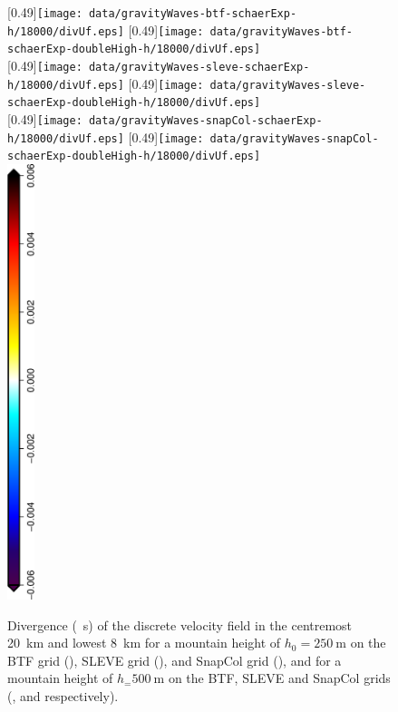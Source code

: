 \begin{figure}
	\captionsetup[subfigure]{position=b}
	\centering
	[0.49\textwidth]{\texttt{[image: data/gravityWaves-btf-schaerExp-h/18000/divUf.eps]}}
	\hfill
	[0.49\textwidth]{\texttt{[image: data/gravityWaves-btf-schaerExp-doubleHigh-h/18000/divUf.eps]}} \\
%
	[0.49\textwidth]{\texttt{[image: data/gravityWaves-sleve-schaerExp-h/18000/divUf.eps]}}
	\hfill
	[0.49\textwidth]{\texttt{[image: data/gravityWaves-sleve-schaerExp-doubleHigh-h/18000/divUf.eps]}} \\
%
	[0.49\textwidth]{\texttt{[image: data/gravityWaves-snapCol-schaerExp-h/18000/divUf.eps]}}
	\hfill
	[0.49\textwidth]{\texttt{[image: data/gravityWaves-snapCol-schaerExp-doubleHigh-h/18000/divUf.eps]}} \\
%
	\includegraphics[height=5in,angle=270]{legends/divU.eps}
%
	\caption{Divergence (\si{\per\second}) of the discrete velocity field in the centremost \SI{20}{\kilo\meter} and lowest \SI{8}{\kilo\meter} for a mountain height of $h_0 = \SI{250}{\meter}$ on the BTF grid (), SLEVE grid (), and SnapCol grid (), and for a mountain height of $h_ = \SI{500}{\meter}$ on the BTF, SLEVE and SnapCol grids (,  and  respectively).}
	\label{fig:gw:div}
\end{figure}

